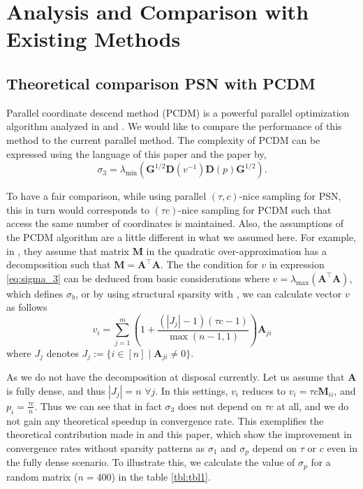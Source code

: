 \documentclass[11pt]{article}
\newcommand{\bA}{\mathbf{A}}
\begin{document}
	
	\section{Analysis and Comparison with Existing Methods}
	\subsection{Theoretical comparison PSN with PCDM}
	
	Parallel coordinate descend method (PCDM) is a powerful parallel optimization algorithm analyzed in \cite{PCDM} and \cite{Richtarik2012}. We would like to compare the performance of this method to the current parallel method. The complexity of PCDM can be expressed using the language of this paper and the paper \cite{SDNA} by,
	\begin{equation}\label{eq:sigma_3}
		\sigma_3 = \lambda_{\min}(\mathbf{G}^{1/2}\mathbf{D}(v^{-1})\mathbf{D}(p)\mathbf{G}^{1/2}).
	\end{equation}
	
	To have a fair comparison, while using parallel $(\tau,c)$-nice sampling for PSN, this in turn would corresponds to $(\tau c)$-nice sampling for PCDM such that access the same number of coordinates is maintained. Also, the assumptions of the PCDM algorithm are a little different in what we assumed here. For example, in \cite{PCDM}, they assume that matrix $\mathbf{M}$ in the quadratic over-approximation has a decomposition such that $\mathbf{M} = \mathbf{A}^\top \mathbf{A}$. The the condition for $v$ in expression \eqref{eq:sigma_3} can be deduced from basic considerations where $v = \lambda_{\max}(\mathbf{A}^\top \mathbf{A})$, which defines $\sigma_b$, or by using structural sparsity with \cite[Proposition 5.1]{ESO}, we can calculate vector $v$ as follows
	\begin{equation} \label{eg:pcdmeq}
		v_i = \sum_{j=1}^{m}\left(1+ \frac{(|J_j|-1)(\tau c -1)  }{\max(n-1,1)}\right)\bA_{ji}
	\end{equation}
	where $J_j$ denotes $J_j:=\{i\in[n] \;|\; \bA_{ji}\neq 0\}$. 
	
	As we do not have the decomposition at disposal currently. Let us assume that $\bA$ is fully dense, and thus $|J_j| = n $ $\forall j$. In this settings, $v_i$ reduces to $v_i = \tau c \mathbf{M}_{ii}$, and $p_i = \frac{\tau c}{n}$. Thus we can see that in fact $\sigma_3$ does not depend on $\tau c $ at all, and we do not gain any theoretical speedup in convergence rate. This exemplifies the theoretical contribution made in \cite{SDNA} and this paper, which show the improvement in convergence rates without sparsity patterns as $\sigma_1$ and $\sigma_p$ depend on $\tau$ or $c$ even in the fully dense scenario. To illustrate this, we calculate the value of $\sigma_p$ for a random matrix ($n=400$) in the table \ref{tbl:tbl1}.
	
\end{document}
